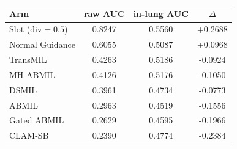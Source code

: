 \begin{tabular}{lccc}
\toprule
Arm & raw AUC & in-lung AUC & $\Delta$ \\
\midrule
Slot ($\mathrm{div}{=}0.5$) & 0.8247 & 0.5560 & +0.2688 \\
Normal Guidance & 0.6055 & 0.5087 & +0.0968 \\
TransMIL & 0.4263 & 0.5186 & -0.0924 \\
MH-ABMIL & 0.4126 & 0.5176 & -0.1050 \\
DSMIL & 0.3961 & 0.4734 & -0.0773 \\
ABMIL & 0.2963 & 0.4519 & -0.1556 \\
Gated ABMIL & 0.2629 & 0.4595 & -0.1966 \\
CLAM-SB & 0.2390 & 0.4774 & -0.2384 \\
\bottomrule
\end{tabular}
